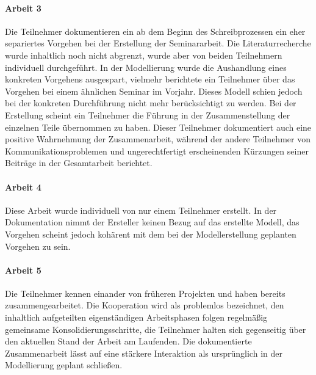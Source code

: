
\paragraph{Arbeit 3} %
\label{par:arbeit_3}

Die Teilnehmer dokumentieren ein ab dem Beginn des Schreibprozessen ein eher separiertes Vorgehen bei der Erstellung der Seminararbeit. Die Literaturrecherche wurde inhaltlich noch nicht abgrenzt, wurde aber von beiden Teilnehmern individuell durchgeführt. In der Modellierung wurde die Aushandlung eines konkreten Vorgehens ausgespart, vielmehr berichtete ein Teilnehmer über das Vorgehen bei einem ähnlichen Seminar im Vorjahr. Dieses Modell schien jedoch bei der konkreten Durchführung nicht mehr berücksichtigt zu werden. Bei der Erstellung scheint ein Teilnehmer die Führung in der Zusammenstellung der einzelnen Teile übernommen zu haben. Dieser Teilnehmer dokumentiert auch eine positive Wahrnehmung der Zusammenarbeit, während der andere Teilnehmer von Kommunikationsproblemen und ungerechtfertigt erscheinenden Kürzungen seiner Beiträge in der Gesamtarbeit berichtet. 

\paragraph{Arbeit 4} %
\label{par:arbeit_4}

Diese Arbeit wurde individuell von nur einem Teilnehmer erstellt. In der Dokumentation nimmt der Ersteller keinen Bezug auf das erstellte Modell, das Vorgehen scheint jedoch kohärent mit dem bei der Modellerstellung geplanten Vorgehen zu sein.

\paragraph{Arbeit 5} %
\label{par:arbeit_5}

Die Teilnehmer kennen einander von früheren Projekten und haben bereits zusammengearbeitet. Die Kooperation wird als problemlos bezeichnet, den inhaltlich aufgeteilten eigenständigen Arbeitsphasen folgen regelmäßig gemeinsame Konsolidierungsschritte, die Teilnehmer halten sich gegenseitig über den aktuellen Stand der Arbeit am Laufenden. Die dokumentierte Zusammenarbeit lässt auf eine stärkere Interaktion als ursprünglich in der Modellierung geplant schließen.


